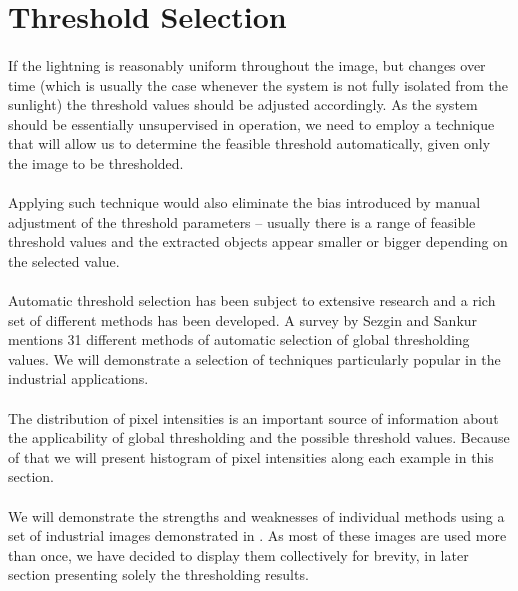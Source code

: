 \section{Threshold Selection}

\paragraph*{}
If the lightning is reasonably uniform throughout the image, but changes over time (which is usually the case whenever the system is not fully isolated from the sunlight) the threshold values should be adjusted accordingly. As the system should be essentially unsupervised in operation, we need to employ a technique that will allow us to determine the feasible threshold automatically, given only the image to be thresholded.

\paragraph*{}
Applying such technique would also eliminate the bias introduced by manual adjustment of the threshold parameters -- usually there is a range of feasible threshold values and the extracted objects appear smaller or bigger depending on the selected value.

\paragraph*{}
Automatic threshold selection has been subject to extensive research and a rich set of different methods has been developed. A survey\cite{SezginSankur04} by Sezgin and Sankur mentions 31 different methods of automatic selection of global thresholding values. We will demonstrate a selection of techniques particularly popular in the industrial applications.

\paragraph*{}
The distribution of pixel intensities is an important source of information about the applicability of global thresholding and the possible threshold values. Because of that we will present histogram of pixel intensities along each example in this section.

\paragraph*{}
We will demonstrate the strengths and weaknesses of individual methods using a set of industrial images demonstrated in . As most of these images are used more than once, we have decided to display them collectively for brevity, in later section presenting solely the thresholding results.

